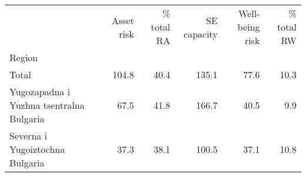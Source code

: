 \begin{tabular}{lrrrrr}
\toprule
{} &  Asset risk &  \% total RA &  SE capacity &  Well-being risk &  \% total RW \\
Region                                   &             &             &              &                  &             \\
\midrule
Total                                    &       104.8 &        40.4 &        135.1 &             77.6 &        10.3 \\
Yugozapadna i Yuzhna tsentralna Bulgaria &        67.5 &        41.8 &        166.7 &             40.5 &         9.9 \\
Severna i Yugoiztochna Bulgaria          &        37.3 &        38.1 &        100.5 &             37.1 &        10.8 \\
\bottomrule
\end{tabular}
